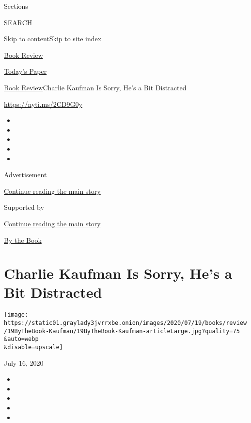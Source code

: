 Sections

SEARCH

\protect\hyperlink{site-content}{Skip to
content}\protect\hyperlink{site-index}{Skip to site index}

\href{https://www.nytimes3xbfgragh.onion/section/books/review}{Book
Review}

\href{https://myaccount.nytimes3xbfgragh.onion/auth/login?response_type=cookie\&client_id=vi}{}

\href{https://www.nytimes3xbfgragh.onion/section/todayspaper}{Today's
Paper}

\href{/section/books/review}{Book Review}\textbar{}Charlie Kaufman Is
Sorry, He's a Bit Distracted

\url{https://nyti.ms/2CD9G0y}

\begin{itemize}
\item
\item
\item
\item
\item
\end{itemize}

Advertisement

\protect\hyperlink{after-top}{Continue reading the main story}

Supported by

\protect\hyperlink{after-sponsor}{Continue reading the main story}

\href{/column/by-the-book}{By the Book}

\hypertarget{charlie-kaufman-is-sorry-hes-a-bit-distracted}{%
\section{Charlie Kaufman Is Sorry, He's a Bit
Distracted}\label{charlie-kaufman-is-sorry-hes-a-bit-distracted}}

\texttt{[image: https://static01.graylady3jvrrxbe.onion/images/2020/07/19/books/review/19ByTheBook-Kaufman/19ByTheBook-Kaufman-articleLarge.jpg?quality=75\\\&auto=webp\\\&disable=upscale]}

July 16, 2020

\begin{itemize}
\item
\item
\item
\item
\item
\end{itemize}

